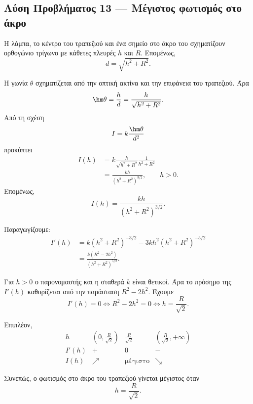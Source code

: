 \subsection*{Λύση Προβλήματος 13 --- Μέγιστος φωτισμός στο άκρο}

Η λάμπα, το κέντρο του τραπεζιού και ένα σημείο στο άκρο του σχηματίζουν
ορθογώνιο τρίγωνο με κάθετες πλευρές $h$ και $R$. Επομένως,
\[
  d=\sqrt{h^2+R^2}.
\]

Η γωνία $\theta$ σχηματίζεται από την οπτική ακτίνα και την επιφάνεια
του τραπεζιού. Άρα
\[
  \hm\theta=\frac{h}{d}
  =\frac{h}{\sqrt{h^2+R^2}}.
\]
Από τη σχέση
\[
  I=k\frac{\hm\theta}{d^2}
\]
προκύπτει
\begin{align*}
  I(h)
  &=k\frac{h}{\sqrt{h^2+R^2}}
       \frac{1}{h^2+R^2}\\
  &=\frac{kh}{(h^2+R^2)^{3/2}},
  \qquad h>0.
\end{align*}
Επομένως,
\[
  {I(h)=\frac{kh}{(h^2+R^2)^{3/2}}}.
\]

Παραγωγίζουμε:
\begin{align*}
  I'(h)
  &=k(h^2+R^2)^{-3/2}
    -3kh^2(h^2+R^2)^{-5/2}\\
  &=\frac{k(R^2-2h^2)}
          {(h^2+R^2)^{5/2}}.
\end{align*}

Για $h>0$ ο παρονομαστής και η σταθερά $k$ είναι θετικοί. Άρα το
πρόσημο της $I'(h)$ καθορίζεται από την παράσταση $R^2-2h^2$.
Έχουμε
\[
  I'(h)=0
  \Longleftrightarrow
  R^2-2h^2=0
  \Longleftrightarrow
  h=\frac{R}{\sqrt2}.
\]

Επιπλέον,
\[
\begin{array}{c|ccc}
  h & \left(0,\frac{R}{\sqrt2}\right)
    & \frac{R}{\sqrt2}
    & \left(\frac{R}{\sqrt2},+\infty\right)\\ \hline
  I'(h) & + & 0 & -\\
  I(h) & \nearrow & \text{μέγιστο} & \searrow
\end{array}
\]

Συνεπώς, ο φωτισμός στο άκρο του τραπεζιού γίνεται μέγιστος όταν
\[
  {h=\frac{R}{\sqrt2}}.
\]
